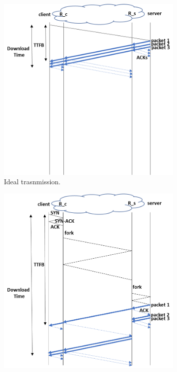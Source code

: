 \documentclass[10pt,sigconf]{acmart}
\begin{document}
\begin{figure}[t]
  \centering
    \begin{subfigure}{0.6\columnwidth}
  \centering
  \includegraphics[width=\columnwidth]{figures/ideal.png}
    \caption{Ideal trasnmission.}
    \label{fig:ideal}
\end{subfigure} \hfill   \centering
\begin{subfigure}{0.6\columnwidth}
  \centering
  \includegraphics[width=\columnwidth]{figures/split.png}

\end{subfigure}
\end{figure}
\end{document}
